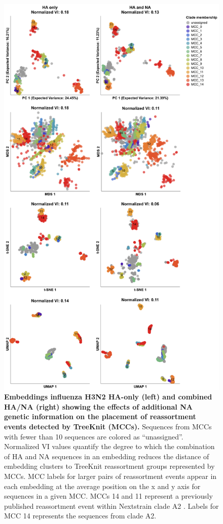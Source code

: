 \begin{figure}[!h]
\includegraphics[width=0.75\columnwidth]{figures/flu-2016-2018-ha-na-all-embeddings-by-mcc.png}
\caption{{\bf Embeddings influenza H3N2 HA-only (left) and combined HA/NA (right) showing the effects of additional NA genetic information on the placement of reassortment events detected by TreeKnit (MCCs).}
  Sequences from MCCs with fewer than 10 sequences are colored as ``unassigned''.
  Normalized VI values quantify the degree to which the combination of HA and NA sequences in an embedding reduces the distance of embedding clusters to TreeKnit reassortment groups represented by MCCs.
  MCC labels for larger pairs of reassortment events appear in each embedding at the average position on the x and y axis for sequences in a given MCC.
  MCCs 14 and 11 represent a previously published reassortment event within Nextstrain clade A2 \citep{Potter2019}.
  Labels for MCC 14 represents the sequences from clade A2.}\label{S_Fig_full_ha_na_embeddings}
\end{figure}

